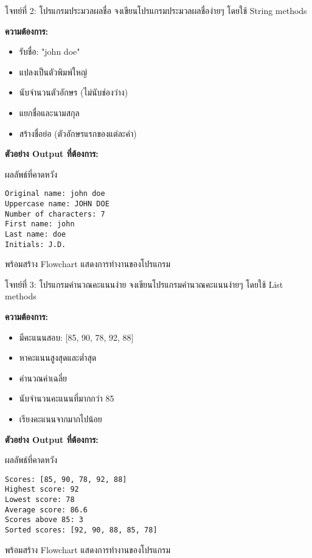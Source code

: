 \documentclass[12pt,a4paper]{article}
\newcommand{\textlight}[1]{{\thailightfont #1}}
\begin{document}
\begin{exercisebox}{โจทย์ที่ 2: โปรแกรมประมวลผลชื่อ}
\textlight{จงเขียนโปรแกรมประมวลผลชื่อง่ายๆ โดยใช้ String methods}

\textlight{\textbf{ความต้องการ:}}
\begin{itemize}
    \item \textlight{รับชื่อ: "john doe"}
    \item \textlight{แปลงเป็นตัวพิมพ์ใหญ่}
    \item \textlight{นับจำนวนตัวอักษร (ไม่นับช่องว่าง)}
    \item \textlight{แยกชื่อและนามสกุล}
    \item \textlight{สร้างชื่อย่อ (ตัวอักษรแรกของแต่ละคำ)}
\end{itemize}

\textlight{\textbf{ตัวอย่าง Output ที่ต้องการ:}}
\begin{codebox}{ผลลัพธ์ที่คาดหวัง}
\begin{lstlisting}[style=python]
Original name: john doe
Uppercase name: JOHN DOE
Number of characters: 7
First name: john
Last name: doe
Initials: J.D.
\end{lstlisting}
\end{codebox}
\textlight{พร้อมสร้าง Flowchart แสดงการทำงานของโปรแกรม}
\end{exercisebox}

\begin{exercisebox}{โจทย์ที่ 3: โปรแกรมคำนวณคะแนนง่าย}
\textlight{จงเขียนโปรแกรมคำนวณคะแนนง่ายๆ โดยใช้ List methods}

\textlight{\textbf{ความต้องการ:}}
\begin{itemize}
    \item \textlight{มีคะแนนสอบ: [85, 90, 78, 92, 88]}
    \item \textlight{หาคะแนนสูงสุดและต่ำสุด}
    \item \textlight{คำนวณค่าเฉลี่ย}
    \item \textlight{นับจำนวนคะแนนที่มากกว่า 85}
    \item \textlight{เรียงคะแนนจากมากไปน้อย}
\end{itemize}

\textlight{\textbf{ตัวอย่าง Output ที่ต้องการ:}}
\begin{codebox}{ผลลัพธ์ที่คาดหวัง}
\begin{lstlisting}[style=python]
Scores: [85, 90, 78, 92, 88]
Highest score: 92
Lowest score: 78
Average score: 86.6
Scores above 85: 3
Sorted scores: [92, 90, 88, 85, 78]
\end{lstlisting}
\end{codebox}
\textlight{พร้อมสร้าง Flowchart แสดงการทำงานของโปรแกรม}
\end{exercisebox}
\end{document}
